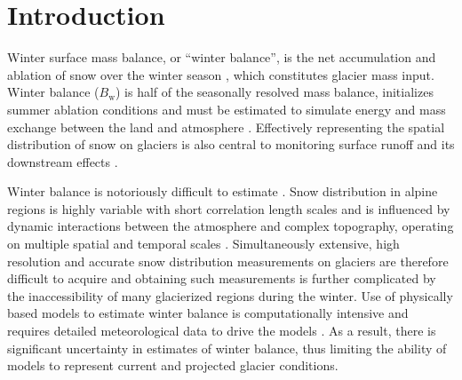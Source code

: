 \documentclass[review,oneside, letterpaper]{igs}
\begin{document}
\section{Introduction}

Winter surface mass balance, or ``winter balance'', is the net accumulation and ablation of snow over the winter season \citep{Cogley2011}, which constitutes glacier mass input. Winter balance ($B_\mathrm{w}$) is half of the seasonally resolved mass balance, initializes summer ablation conditions and must be estimated to simulate energy and mass exchange between the land and atmosphere \citep[e.g.][]{Hock2005,Reveillet2016}. Effectively representing the spatial distribution of snow on glaciers is also central to monitoring surface runoff and its downstream effects \citep[e.g.][]{Clark2011}.

Winter balance is notoriously difficult to estimate \citep[e.g.][]{Dadic2010, Cogley2011}. Snow distribution in alpine regions is highly variable with short correlation length scales \citep[e.g.][]{Anderton2004, Egli2011, Grunewald2010, Helbig2017, Lopez2011, Lopez2013, Machguth2006, Marshall2006} and is influenced by dynamic interactions between the atmosphere and complex topography, operating on multiple spatial and temporal scales \citep[e.g.][]{Barry1992, Liston2006, Clark2011,Scipion2013}. Simultaneously extensive, high resolution and accurate snow distribution measurements on glaciers are therefore difficult to acquire \citep[e.g.][]{Cogley2011, McGrath2015} and obtaining such measurements is further complicated by the inaccessibility of many glacierized regions during the winter. Use of physically based models to estimate winter balance is computationally intensive and requires detailed meteorological data to drive the models \citep{Dadic2010}. As a result, there is significant uncertainty in estimates of winter balance, thus limiting the ability of models to represent current and projected glacier conditions.
\end{document}
